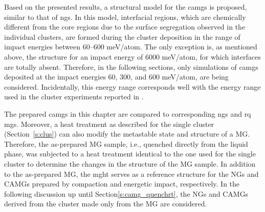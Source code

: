 \begin{changebar}
Based on the presented results, a structural model for the \gls{camg}s is proposed, similar to that of \gls{ng}s. In this model, interfacial regions, which are chemically different from the core regions due to the surface segregation observed in the individual clusters, are formed during the cluster deposition in the range of impact energies between 60–600 meV/atom. The only exception is, as mentioned above, the structure for an impact energy of 6000 meV/atom, for which interfaces are totally absent. Therefore, in the following sections, only simulations of \gls{camg}s deposited at the impact energies 60, 300, and 600 meV/atom, are being considered. Incidentally, this energy range corresponds well with the energy range used in the cluster experiments reported in \cite{Benel2019}. \par

The prepared \gls{camg}s in this chapter are compared to corresponding \gls{ng}s and \gls{rq} \gls{mg}s. Moreover, a heat treatment as described for the single cluster (Section~\ref{s:clus}) can also modify the metastable state and structure of a MG. Therefore, the as-prepared MG sample, i.e., quenched directly from the liquid phase, was subjected to a heat treatment identical to the one used for the single cluster to determine the changes in the structure of the MG sample. In addition to the as-prepared MG, the \gls{mght} serves as a reference structure for the NGs and CAMGs prepared by compaction and energetic impact, respectively. In the following discussion up until Section\ref{s:camg_quenchrt}, the NGs and CAMGs derived from the cluster made only from the  MG are considered. \par
\end{changebar}


%
